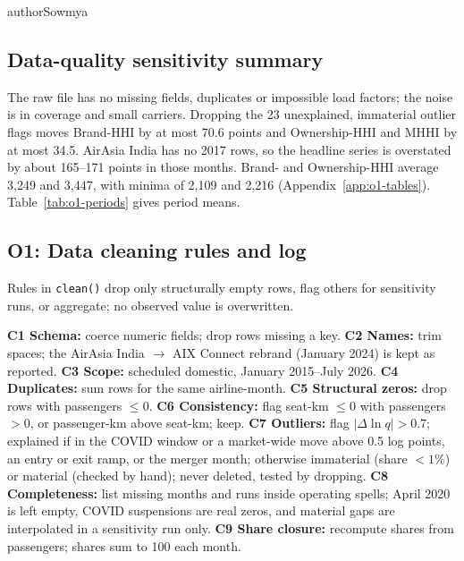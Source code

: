 \begin{mergedcontribution}{authorSowmya}
\subsection{Data-quality sensitivity summary}
The raw file has no missing fields, duplicates or impossible load factors; the noise is in coverage and small carriers. Dropping the 23 unexplained, immaterial outlier flags moves Brand-HHI by at most 70.6 points and Ownership-HHI and MHHI by at most 34.5. AirAsia India has no 2017 rows, so the headline series is overstated by about 165--171 points in those months. Brand- and Ownership-HHI average 3,249 and 3,447, with minima of 2,109 and 2,216 (Appendix~\ref{app:o1-tables}). Table~\ref{tab:o1-periods} gives period means.

\subsection{O1: Data cleaning rules and log}
\label{app:o1-cleaning}
Rules in \texttt{clean()} drop only structurally empty rows, flag others for sensitivity runs, or aggregate; no observed value is overwritten.

\textbf{C1 Schema:} coerce numeric fields; drop rows missing a key. \textbf{C2 Names:} trim spaces; the AirAsia India $\to$ AIX Connect rebrand (January 2024) is kept as reported. \textbf{C3 Scope:} scheduled domestic, January 2015--July 2026. \textbf{C4 Duplicates:} sum rows for the same airline-month. \textbf{C5 Structural zeros:} drop rows with passengers $\leq0$. \textbf{C6 Consistency:} flag seat-km $\leq0$ with passengers $>0$, or passenger-km above seat-km; keep. \textbf{C7 Outliers:} flag $|\Delta\ln q|>0.7$; explained if in the COVID window or a market-wide move above 0.5 log points, an entry or exit ramp, or the merger month; otherwise immaterial (share $<1\%$) or material (checked by hand); never deleted, tested by dropping. \textbf{C8 Completeness:} list missing months and runs inside operating spells; April 2020 is left empty, COVID suspensions are real zeros, and material gaps are interpolated in a sensitivity run only. \textbf{C9 Share closure:} recompute shares from passengers; shares sum to 100 each month.


\end{mergedcontribution}
